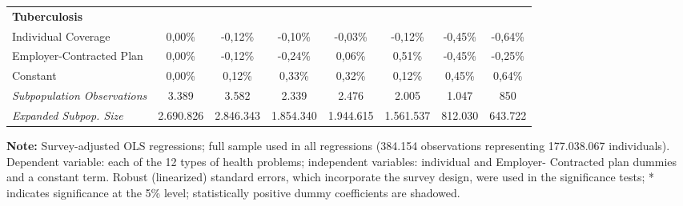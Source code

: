 \documentclass{article}
\begin{document}
\begin{table*}
{\begin{tabular}{l*{7}{c}}
\midrule
\textbf{Tuberculosis}  & & & & & & & \\

Individual Coverage      &  0,00\%         & -0,12\%         & -0,10\%         & -0,03\%         & -0,12\%         & -0,45\%         & -0,64\%         \\
Employer-Contracted Plan &  0,00\%         & -0,12\%         & -0,24\%         &  0,06\%         &  0,51\%         & -0,45\%         & -0,25\%         \\
Constant                 &  0,00\%         &  0,12\%         &  0,33\%         &  0,32\%         &  0,12\%         &  0,45\%         &  0,64\%         \\

\midrule

\textit{Subpopulation Observations} 	& 3.389 & 3.582 & 2.339 & 2.476 & 2.005 & 1.047 & 850         \\
\textit{Expanded Subpop. Size} 		& 2.690.826 & 2.846.343 & 1.854.340 & 1.944.615 & 1.561.537 & 812.030 & 643.722      \\

	\hline \hline

\end{tabular}}

\justify \small {} \textbf{Note:} Survey-adjusted OLS regressions; full sample used in all regressions (384.154 observations representing 177.038.067
individuals). Dependent variable: each of the 12 types of health problems; independent variables: individual and Employer-
Contracted plan dummies and a constant term. Robust (linearized) standard errors, which incorporate the survey design, were
used in the significance tests; * indicates significance at the 5\% level; statistically positive dummy coefficients are shadowed.

\end{table*}
\end{document}
